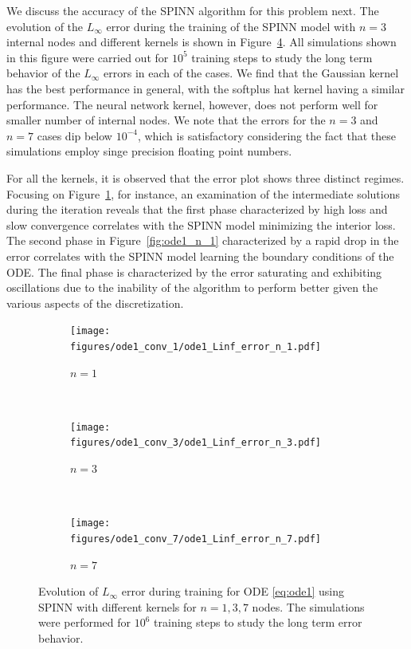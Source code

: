 \documentclass[12pt]{article}
\newcommand{\rr}[1]{#1}
\newcommand{\rb}[1]{#1}
\newcommand{\new}[1]{#1}
\begin{document}
\rr{We discuss the accuracy of the SPINN algorithm for this problem next. The evolution of the $L_\infty$ error during the training of the SPINN model with $n=3$ internal nodes and different kernels is shown in Figure~\ref{fig:spinn_ode_1_errors}.} \rb{All simulations shown in this figure were carried out for $10^5$ training steps to study the long term behavior of the  $L_\infty$ errors in each of the cases. We find that the Gaussian kernel has the best performance in general, with the softplus hat kernel having a similar performance. The neural network kernel, however, does not perform well for smaller number of internal nodes. We note that the errors for the $n=3$ and $n=7$ cases dip below $10^{-4}$, which is satisfactory considering the fact that these simulations employ singe precision floating point numbers.}

For all the kernels, it is observed that the error plot shows \new{three} distinct regimes. Focusing on Figure~\ref{fig:ode1_n_1_error}, for instance, an examination of the intermediate solutions during the iteration reveals that the first phase characterized by high loss and slow convergence correlates with the SPINN model minimizing the interior loss. The second phase in Figure~\ref{fig:ode1_n_1} characterized by a rapid drop in the error correlates with the SPINN model learning the boundary conditions of the ODE. \new{The final phase is characterized by the error saturating and exhibiting oscillations due to the inability of the algorithm to perform better given the various aspects of the discretization.}

\begin{figure}
\centering
\begin{subfigure}{0.3\textwidth}
\texttt{[image: figures/ode1\_conv\_1/ode1\_Linf\_error\_n\_1.pdf]}
\caption{$n=1$}
\label{fig:ode1_n_1_error}
\end{subfigure}
~
\begin{subfigure}{0.3\textwidth}
\texttt{[image: figures/ode1\_conv\_3/ode1\_Linf\_error\_n\_3.pdf]}
\caption{$n=3$}
\label{fig:ode1_n_3_error}
\end{subfigure}
~
\begin{subfigure}{0.3\textwidth}
\texttt{[image: figures/ode1\_conv\_7/ode1\_Linf\_error\_n\_7.pdf]}
\caption{$n=7$}
\label{fig:ode1_n_7_error}
\end{subfigure}
\caption{Evolution of $L_\infty$ error during training for ODE \eqref{eq:ode1} using SPINN with different kernels for $n=1,3,7$ nodes. \rb{The simulations were performed for $10^6$ training steps to study the long term error behavior.}}
\label{fig:spinn_ode_1_errors}
\end{figure}
\end{document}
